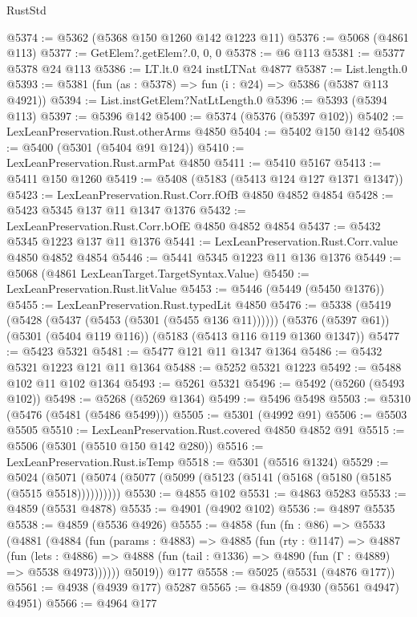\begin{lexlean}{RustStd}
\begin{coremodule}
@5374 := @5362 (@5368 @150 @1260 @142 @1223 @11)
@5376 := @5068 (@4861 @113)
@5377 := GetElem?.getElem?.{0, 0, 0}
@5378 := @6 @113
@5381 := @5377 @5378 @24 @113
@5386 := LT.lt.{0} @24 instLTNat @4877
@5387 := List.length.{0}
@5393 := @5381 (fun (as : @5378) => fun (i : @24) => @5386 (@5387 @113 @4921))
@5394 := List.instGetElem?NatLtLength.{0}
@5396 := @5393 (@5394 @113)
@5397 := @5396 @142
@5400 := @5374 (@5376 (@5397 @102))
@5402 := LexLeanPreservation.Rust.otherArms @4850
@5404 := @5402 @150 @142
@5408 := @5400 (@5301 (@5404 @91 @124))
@5410 := LexLeanPreservation.Rust.armPat @4850
@5411 := @5410 @5167
@5413 := @5411 @150 @1260
@5419 := @5408 (@5183 (@5413 @124 @127 @1371 @1347))
@5423 := LexLeanPreservation.Rust.Corr.fOfB @4850 @4852 @4854
@5428 := @5423 @5345 @137 @11 @1347 @1376
@5432 := LexLeanPreservation.Rust.Corr.bOfE @4850 @4852 @4854
@5437 := @5432 @5345 @1223 @137 @11 @1376
@5441 := LexLeanPreservation.Rust.Corr.value @4850 @4852 @4854
@5446 := @5441 @5345 @1223 @11 @136 @1376
@5449 := @5068 (@4861 LexLeanTarget.TargetSyntax.Value)
@5450 := LexLeanPreservation.Rust.litValue
@5453 := @5446 (@5449 (@5450 @1376))
@5455 := LexLeanPreservation.Rust.typedLit @4850
@5476 := @5338
    (@5419 (@5428 (@5437 (@5453 (@5301 (@5455 @136 @11))))))
    (@5376 (@5397 @61))
    (@5301 (@5404 @119 @116))
    (@5183 (@5413 @116 @119 @1360 @1347))
@5477 := @5423 @5321
@5481 := @5477 @121 @11 @1347 @1364
@5486 := @5432 @5321 @1223 @121 @11 @1364
@5488 := @5252 @5321 @1223
@5492 := @5488 @102 @11 @102 @1364
@5493 := @5261 @5321
@5496 := @5492 (@5260 (@5493 @102))
@5498 := @5268 (@5269 @1364)
@5499 := @5496 @5498
@5503 := @5310 (@5476 (@5481 (@5486 @5499)))
@5505 := @5301 (@4992 @91)
@5506 := @5503 @5505
@5510 := LexLeanPreservation.Rust.covered @4850 @4852 @91
@5515 := @5506 (@5301 (@5510 @150 @142 @280))
@5516 := LexLeanPreservation.Rust.isTemp
@5518 := @5301 (@5516 @1324)
@5529 := @5024 (@5071 (@5074 (@5077 (@5099 (@5123 (@5141 (@5168 (@5180 (@5185 (@5515 @5518))))))))))
@5530 := @4855 @102
@5531 := @4863 @5283
@5533 := @4859 (@5531 @4878)
@5535 := @4901 (@4902 @102)
@5536 := @4897 @5535
@5538 := @4859 (@5536 @4926)
@5555 := @4858
    (fun (fn : @86) =>
    @5533
      (@4881
        (@4884
          (fun (params : @4883) =>
          @4885
            (fun (rty : @1147) =>
            @4887
              (fun (lets : @4886) =>
              @4888 (fun (tail : @1336) => @4890 (fun (Γ : @4889) => @5538 @4973))))))
        @5019))
    @177
@5558 := @5025 (@5531 (@4876 @177))
@5561 := @4938 (@4939 @177) @5287
@5565 := @4859 (@4930 (@5561 @4947) @4951)
@5566 := @4964 @177

\end{coremodule}
\end{lexlean}
